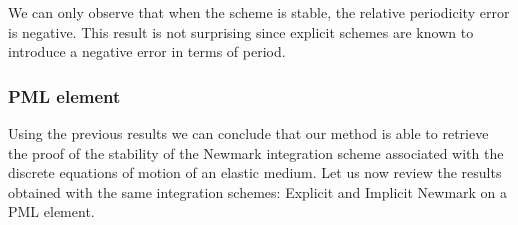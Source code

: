\begin{itemize}
\begin{figure}[H]
\begin{minipage}{.5\textwidth}
  \label{fig:num_damp_med_exp}
\end{minipage}
\end{figure} 
We can only observe that when the scheme is stable, the relative periodicity error is negative. This result is not surprising since explicit schemes are known to introduce a negative error in terms of period.     
\end{itemize}

\subsubsection{PML element}
Using the previous results we can conclude that our method is able to retrieve the proof of the stability of the Newmark integration scheme associated with the discrete equations of motion of an elastic medium. Let us now review the results obtained with the same integration schemes: Explicit and Implicit Newmark on a PML element.
